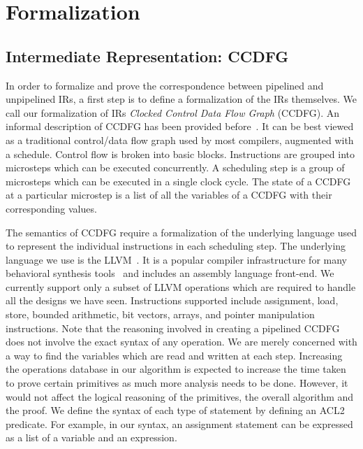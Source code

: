 \chapter{Formalization}
\label{sec:formalization}

\section{Intermediate Representation: CCDFG}

In order to formalize and prove the correspondence between pipelined
and unpipelined IRs, a first step is to define a formalization of the
IRs themselves.  We call our formalization of IRs {\em Clocked Control
  Data Flow Graph} (CCDFG).  An informal description of CCDFG has been
provided before~\cite{rhcxy:atva-09}.  It can be best viewed as a
traditional control/data flow graph used by most compilers, augmented
with a schedule. Control flow is broken into basic blocks.
Instructions are grouped into microsteps which can be executed
concurrently.  A scheduling step is a group of microsteps which can be
executed in a single clock cycle. The state of a CCDFG at a particular
microstep is a list of all the variables of a CCDFG with their
corresponding values.

The semantics of CCDFG require a formalization of the
underlying language used to represent the individual
instructions in each scheduling step. The underlying
language we use is the LLVM~\cite{llvm-phi-Jordans}.  It is a popular
compiler infrastructure for many behavioral synthesis tools~\cite{xpilot,legup} and includes an assembly language front-end.  We currently support
only a subset of LLVM operations which are required to handle all the designs we have
seen.  Instructions supported include assignment, load,
store, bounded arithmetic, bit vectors, arrays, and pointer
manipulation instructions.  Note that the reasoning involved 
in creating a pipelined CCDFG does not involve the exact 
syntax of any operation. We are merely concerned with a way 
to find the variables which are read and written at each step.
Increasing the operations database in our algorithm 
is expected to increase the time taken to prove certain primitives as much 
more analysis needs to be done.
However, it would not affect the logical reasoning of the primitives, the overall
algorithm and the proof.  
We define the syntax of each
type of statement by defining an ACL2 predicate.  For
example, in our syntax, an assignment statement can be
expressed as a list of a variable and an
expression.

